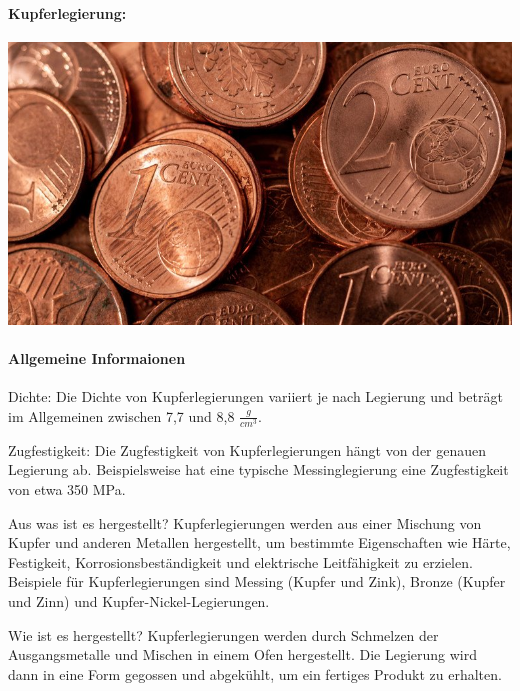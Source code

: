 \documentclass{article}
\begin{document}

\newpage
\pagestyle{fancy}
\fancyhf{}

\begin{multicols}{3}

\paragraph{Kupferlegierung:}
\includegraphics[width=\linewidth]{copper.jpg}
\paragraph{Allgemeine Informaionen} Dichte: Die Dichte von Kupferlegierungen
variiert je nach Legierung und beträgt im Allgemeinen zwischen 7,7 und 8,8 $\frac{g}{cm^3}$.

Zugfestigkeit: Die Zugfestigkeit von Kupferlegierungen hängt von der genauen
Legierung ab. Beispielsweise hat eine typische Messinglegierung eine
Zugfestigkeit von etwa 350 MPa.

Aus was ist es hergestellt? Kupferlegierungen werden aus einer Mischung von
Kupfer und anderen Metallen hergestellt, um bestimmte Eigenschaften wie Härte,
Festigkeit, Korrosionsbeständigkeit und elektrische Leitfähigkeit zu erzielen.
Beispiele für Kupferlegierungen sind Messing (Kupfer und Zink), Bronze (Kupfer
und Zinn) und Kupfer-Nickel-Legierungen.

Wie ist es hergestellt? Kupferlegierungen werden durch Schmelzen der
Ausgangsmetalle und Mischen in einem Ofen hergestellt. Die Legierung wird dann
in eine Form gegossen und abgekühlt, um ein fertiges Produkt zu erhalten.


\end{multicols}
\end{document}
